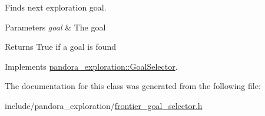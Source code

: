 \-Finds next exploration goal. 


\begin{DoxyParams}{\-Parameters}
{\em goal} & \-The goal \\
\hline
\end{DoxyParams}
\begin{DoxyReturn}{\-Returns}
\-True if a goal is found 
\end{DoxyReturn}


\-Implements \hyperlink{classpandora__exploration_1_1_goal_selector_a0f22d1642c779a143227ddc82dadaeca}{pandora\-\_\-exploration\-::\-Goal\-Selector}.



\-The documentation for this class was generated from the following file\-:\begin{DoxyCompactItemize}
\item 
include/pandora\-\_\-exploration/\hyperlink{frontier__goal__selector_8h}{frontier\-\_\-goal\-\_\-selector.\-h}\end{DoxyCompactItemize}
